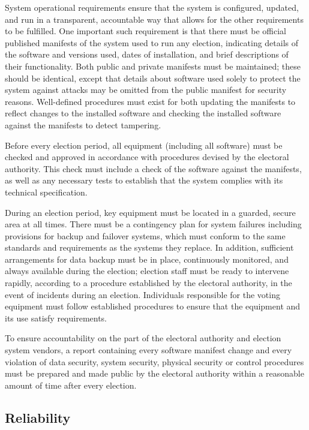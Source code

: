 System operational requirements ensure that the system is configured,
updated, and run in a transparent, accountable way that allows for the
other requirements to be fulfilled. One important such requirement is
that there must be official published manifests of the system used to
run any election, indicating details of the software and versions
used, dates of installation, and brief descriptions of their
functionality. Both public and private manifests must be maintained;
these should be identical, except that details about software used
solely to protect the system against attacks may be omitted from the
public manifest for security reasons. Well-defined procedures must
exist for both updating the manifests to reflect changes to the
installed software and checking the installed software against the
manifests to detect tampering.

Before every election period, all equipment (including all software)
must be checked and approved in accordance with procedures devised by
the electoral authority. This check must include a check of the
software against the manifests, as well as any necessary tests to
establish that the system complies with its technical specification.

During an election period, key equipment must be located in a guarded,
secure area at all times. There must be a contingency plan for system
failures including provisions for backup and failover systems, which
must conform to the same standards and requirements as the systems
they replace. In addition, sufficient arrangements for data backup
must be in place, continuously monitored, and always available during
the election; election staff must be ready to intervene rapidly,
according to a procedure established by the electoral authority, in
the event of incidents during an election. Individuals responsible for
the voting equipment must follow established procedures to ensure that
the equipment and its use satisfy requirements.
 
To ensure accountability on the part of the electoral authority and
election system vendors, a report containing every software manifest
change and every violation of data security, system security, physical
security or control procedures must be prepared and made public by the
electoral authority within a reasonable amount of time after every
election.


\subsection{Reliability}

